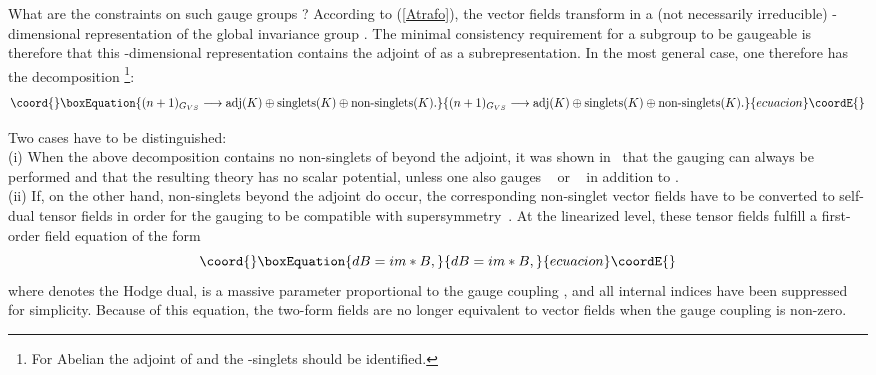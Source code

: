 \documentclass[a4paper,11pt]{article}
\providecommand{\ti}{\ensuremath{\tilde{I}}}
\begin{document}
What are the constraints on such gauge groups \coordHE{}? According to
(\ref{Atrafo}), the \coordHE{} vector fields \myHighlight{$A_{\mu}^{\ti}$}\coordHE{}
transform in a (not necessarily irreducible) \coordHE{}-dimensional
representation of the global invariance group \coordHE{}. The
minimal consistency requirement for a subgroup \coordHE{}
to be gaugeable is therefore that this \coordHE{}-dimensional
representation contains the adjoint of \coordHE{} as a subrepresentation.
In the most general case, one therefore has the decomposition
\footnote{For \coordHE{} Abelian the adjoint of \coordHE{} and the \coordHE{}-singlets
should be identified.}:
\begin{equation}\coord{}\boxEquation{
(n+1)_{G_{VS}}\longrightarrow \textrm{adj}(K) \oplus
\textrm{singlets}(K) \oplus \textrm{non-singlets}(K).
}{
(n+1)_{G_{VS}}\longrightarrow \textrm{adj}(K) \oplus
\textrm{singlets}(K) \oplus \textrm{non-singlets}(K).
}{ecuacion}\coordE{}\end{equation}

Two cases have to be distinguished:\\

(i) When the above decomposition contains no non-singlets of \coordHE{}
beyond the adjoint, it was shown in~\cite{GST2} that the gauging
can always be performed and that the resulting theory has no
scalar potential, unless one also gauges \coordHE{}~\cite{GZ1} or
\coordHE{}~\cite{GZ3} in addition to \coordHE{}.\\


(ii) If, on the other hand, non-singlets beyond the adjoint do occur,
the corresponding non-singlet vector fields have to be converted
to self-dual tensor fields \coordHE{} in order
for the gauging to be compatible with supersymmetry~\cite{GZ1}. At
the linearized level, these tensor fields fulfill a first-order
field equation of the form~\cite{PTvN}
\begin{equation}\coord{}\boxEquation{
dB=im \ast B,
}{
dB=im \ast B,
}{ecuacion}\coordE{}\end{equation}
where \myHighlight{$\ast$}\coordHE{} denotes the Hodge dual, \coordHE{} is a massive parameter
proportional to the gauge coupling \coordHE{}, and all internal indices
have been suppressed for simplicity. Because of this equation, the
two-form fields \coordHE{} are no longer equivalent to vector
fields when the gauge coupling is non-zero.
\end{document}
